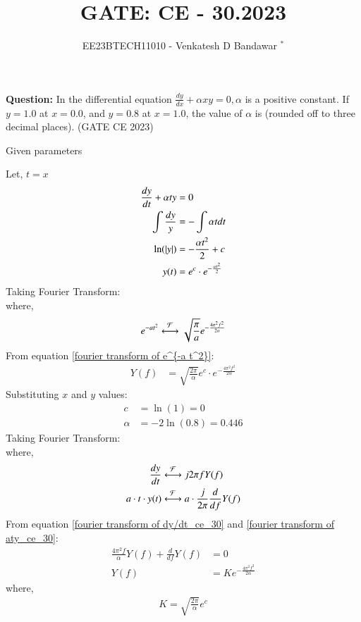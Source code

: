 \documentclass[journal,12pt,twocolumn]{IEEEtran}
\theoremstyle{remark}
\begin{document}

\vspace{3cm}

\title{GATE: CE - 30.2023}
\author{EE23BTECH11010 - Venkatesh D Bandawar $^{*}$%
}
\maketitle
\bigskip


\textbf{Question:} In the differential equation $\frac{dy}{dx} + \alpha x y = 0, \alpha$ is a positive constant. If $y = 1.0$ at
$x = 0.0$, and $y = 0.8$ at $x = 1.0$, the value of $\alpha$ is (rounded off to three decimal places).  \hfill(GATE CE 2023)

\solution
\begin{table}[!h] 
\centering

\caption{Given parameters}
\label{given parameters list.gate.ce.30}
\end{table}

Let, $t=x$
\begin{align}
    \frac{dy}{dt} + \alpha t y &= 0\\
    \int \frac{dy}{y} &= - \int \alpha t dt\\
    \ln(\left\vert y\right\vert) &= - \frac{\alpha t^2}{2} + c\\
    y(t) &= e^c\cdot e^{- \frac{\alpha t^2}{2}} 
\end{align}
Taking Fourier Transform:\\
where,
\begin{align}
    e^{-a t^2} \system{\mathcal{F}} \sqrt{\frac{\pi}{a}} e^{-\frac{4\pi^2 f^2}{2\alpha}}\label{fourier transform of e^{-a t^2}}
\end{align}
From equation \eqref{fourier transform of e^{-a t^2}}:
\begin{align}
     Y(f) &=  \sqrt{\frac{2\pi}{\alpha}}e^c \cdot e^{-\frac{4\pi^2 f^2}{2\alpha}}
\end{align}
Substituting $x$ and $y$ values:
\begin{align}
    c &= \ln(1) = 0\\
    \alpha &= -2 \ln(0.8) = 0.446
\end{align}
Taking Fourier Transform:\\
where,
\begin{align}
    \frac{dy}{dt} & \system{\mathcal{F}} j 2\pi f Y(f) \label{fourier transform of dy/dt_ce_30}\\
    a \cdot t \cdot y(t) & \system{\mathcal{F}} a \cdot \frac{j}{2\pi} \frac{d}{df} Y(f)\label{fourier transform of aty_ce_30}
\end{align}
From equation \eqref{fourier transform of dy/dt_ce_30} and \eqref{fourier transform of aty_ce_30}:
\begin{align}
    \frac{4\pi^2 f}{\alpha} Y(f) + \frac{d}{df} Y(f) &= 0\\
    Y(f) &= K e^{-\frac{4\pi^2 f^2}{2\alpha}}
\end{align}
where, 
\begin{align}
    K =  \sqrt{\frac{2\pi}{\alpha}}e^c
\end{align}
\end{document}
